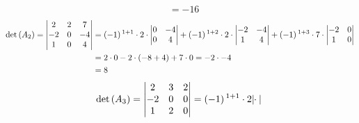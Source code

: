 \begin{enumerate}[label=\listAlph]
\[\begin{aligned}
                    &= -16
                \end{aligned}
            \]
            \[
                \begin{aligned}
                    \text{det} \left( A_2 \right) =
                    \begin{vmatrix}
                        2 & 2 & 7 \\
                        -2 & 0 & -4 \\
                        1 & 0 & 4
                    \end{vmatrix}
                    &=
                    \left(-1\right){}^{1 + 1} \cdot 
                    2 \cdot 
                    \begin{vmatrix}
                        0 & -4 \\
                        0 & 4
                    \end{vmatrix}
                    + \left(-1\right){}^{1 + 2} \cdot 
                    2 \cdot 
                    \begin{vmatrix}
                        -2 & -4 \\
                        1 & 4
                    \end{vmatrix}
                    +\left(-1\right){}^{1 + 3} \cdot 
                    7 \cdot 
                    \begin{vmatrix}
                        -2 & 0 \\
                        1 & 0
                    \end{vmatrix}
                    \\
                    &=
                    2 \cdot 0
                    -2 \cdot \left(-8 + 4\right)
                    +7 \cdot 0
                    = -2 \cdot -4
                    \\
                    &= 8
                \end{aligned}
            \]
            \[
                \begin{aligned}
                    \text{det} \left( A_3 \right) =
                    \begin{vmatrix}
                        2 & 3 & 2 \\
                        -2 & 0 & 0 \\
                        1 & 2 & 0
                    \end{vmatrix}
                    &=
                    \left(-1\right){}^{1 + 1} \cdot 
                    2 \cdot 
                    \begin{vmatrix}

\end{vmatrix}
\end{aligned}\]
\end{enumerate}
